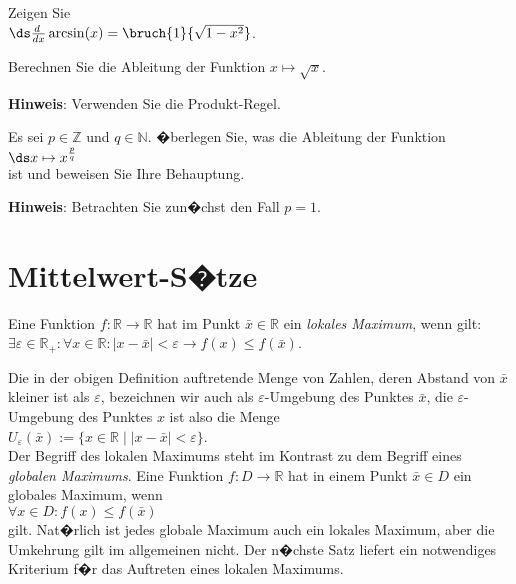 \exercise
Zeigen Sie 
\\[0.3cm]
\hspace*{1.3cm} $\ds\frac{d\;}{dx} \arcsin(x) = \bruch{1}{\sqrt{1 - x^2}}$.  \eox



\exercise
Berechnen Sie die Ableitung der Funktion $x \mapsto \sqrt{x}$.  
\vspace*{0.3cm}

\noindent
\textbf{Hinweis}: Verwenden Sie die Produkt-Regel. \eox

\exercise
Es sei $p \in \mathbb{Z}$ und $q \in \mathbb{N}$.  �berlegen Sie, was die Ableitung der Funktion
\\[0.2cm]
\hspace*{1.3cm}
$\ds x \mapsto x^{\frac{p}{q}}$
\\[0.2cm]
ist und beweisen Sie Ihre Behauptung.
\vspace*{0.3cm}

\noindent
\textbf{Hinweis}: Betrachten Sie zun�chst den Fall $p = 1$.  \eox


\section{Mittelwert-S�tze}
\begin{Definition}
  Eine Funktion $f:\mathbb{R} \rightarrow \mathbb{R}$ hat im Punkt $\bar{x}\in \mathbb{R}$ ein \emph{lokales Maximum}, wenn gilt:
  \\[0.2cm]
  \hspace*{1.3cm}
  $\exists \varepsilon \in \mathbb{R}_+: \forall x \in \mathbb{R}: |x - \bar{x}| < \varepsilon
  \rightarrow f(x) \leq f(\bar{x})$.
  \eod
\end{Definition}

Die in der obigen Definition auftretende Menge von Zahlen, deren Abstand von $\bar{x}$
kleiner ist als $\varepsilon$, bezeichnen wir auch als $\varepsilon$-Umgebung des Punktes
$\bar{x}$, die $\varepsilon$-Umgebung des Punktes $x$ ist also die Menge 
\\[0.2cm]
\hspace*{1.3cm} $U_\varepsilon(\bar{x}) := \bigl\{ x \in \mathbb{R} \;\big|\; |x - \bar{x}| < \varepsilon \bigr\}$.
\\[0.2cm]
Der Begriff des lokalen Maximums steht im Kontrast zu dem Begriff eines \emph{globalen Maximums}.
Eine Funktion $f:D \rightarrow \mathbb{R}$ hat in einem Punkt $\bar{x} \in D$ ein globales
Maximum, wenn
\\[0.2cm]
\hspace*{1.3cm}
$\forall x \in D: f(x) \leq f(\bar{x})$
\\[0.2cm]
gilt.  Nat�rlich ist jedes globale Maximum auch ein lokales Maximum, aber die Umkehrung
gilt im allgemeinen nicht.  Der n�chste Satz liefert ein notwendiges Kriterium f�r das
Auftreten eines lokalen Maximums.

